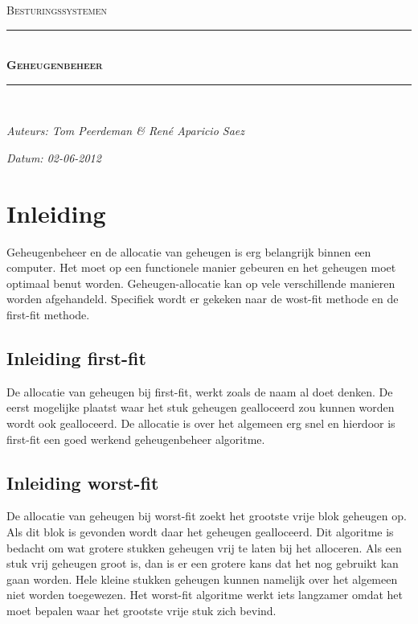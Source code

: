 \documentclass[a4paper]{article}
\newcommand{\HRule}{\rule{\linewidth}{0.5mm}}
\begin{document}
	\begin{titlepage}
	\begin{center}
		\textsc{\Large Besturingssystemen}\\[0.5cm]
		\HRule \\[0,4cm]
		\textsc{\huge \bfseries Geheugenbeheer}
		\HRule \\[8cm]
		\begin{minipage}{0.4\textwidth}
			\begin{flushleft}\large
				\emph{Auteurs: Tom Peerdeman \& Ren\'e Aparicio Saez}\\
			\end{flushleft}
		\end{minipage}
		\begin{minipage}{0.4\textwidth}
			\begin{flushright}\large
			\emph{Datum: 02-06-2012\\}
			\end{flushright}
		\end{minipage}
	\end{center}
	\end{titlepage}

	\tableofcontents
	\newpage

	\section{Inleiding}\label{sec:inleiding}
		Geheugenbeheer en de allocatie van geheugen is erg belangrijk binnen een computer.
		Het moet op een functionele manier gebeuren en het geheugen moet optimaal benut worden.
		Geheugen-allocatie kan op vele verschillende manieren worden afgehandeld.
		Specifiek wordt er gekeken naar de wost-fit methode en de first-fit methode.

	\subsection{Inleiding first-fit}\label{sec:inleidingff}
		De allocatie van geheugen bij first-fit, werkt zoals de naam al doet denken.
		De eerst mogelijke plaatst waar het stuk geheugen gealloceerd zou kunnen worden wordt ook gealloceerd.		
		De allocatie is over het algemeen erg snel en hierdoor is first-fit een goed werkend geheugenbeheer algoritme.

	\subsection{Inleiding worst-fit}\label{sec:inleidingwf}
		De allocatie van geheugen bij worst-fit zoekt het grootste vrije blok geheugen op.
		Als dit blok is gevonden wordt daar het geheugen gealloceerd.
		Dit algoritme is bedacht om wat grotere stukken geheugen vrij te laten bij het alloceren.
		Als een stuk vrij geheugen groot is, dan is er een grotere kans dat het nog gebruikt kan gaan worden.
		Hele kleine stukken geheugen kunnen namelijk over het algemeen niet worden toegewezen.
		Het worst-fit algoritme werkt iets langzamer omdat het moet bepalen waar het grootste vrije stuk zich bevind.\\[1.5cm]
\end{document}

